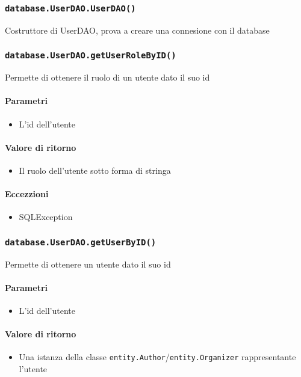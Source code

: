 \subsubsection{\texttt{database.UserDAO.UserDAO()}}
Costruttore di UserDAO, prova a creare una connesione con il database

\subsubsection{\texttt{database.UserDAO.getUserRoleByID()}}
Permette di ottenere il ruolo di un utente dato il suo id
\paragraph{Parametri}
\begin{itemize}
\item L'id dell'utente
\end{itemize}
\paragraph{Valore di ritorno}
\begin{itemize}
\item Il ruolo dell'utente sotto forma di stringa
\end{itemize}
\paragraph{Eccezzioni}
\begin{itemize}
  \item SQLException
\end{itemize}

\subsubsection{\texttt{database.UserDAO.getUserByID()}}
Permette di ottenere un utente dato il suo id
\paragraph{Parametri}
\begin{itemize}
\item L'id dell'utente
\end{itemize}
\paragraph{Valore di ritorno}
\begin{itemize}
\item Una istanza della classe
  \texttt{entity.Author}/\texttt{entity.Organizer} rappresentante
  l'utente
\end{itemize}
